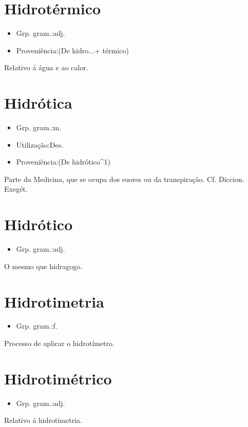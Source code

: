 \documentclass{article}
\begin{document}
\section{Hidrotérmico}
\begin{itemize}
\item {Grp. gram.:adj.}
\end{itemize}
\begin{itemize}
\item {Proveniência:(De \textunderscore hidro...\textunderscore  + \textunderscore térmico\textunderscore )}
\end{itemize}
Relativo á água e ao calor.
\section{Hidrótica}
\begin{itemize}
\item {Grp. gram.:m.}
\end{itemize}
\begin{itemize}
\item {Utilização:Des.}
\end{itemize}
\begin{itemize}
\item {Proveniência:(De \textunderscore hidrótico\textunderscore ^1)}
\end{itemize}
Parte da Medicina, que se ocupa dos suores ou da transpiração. Cf. \textunderscore Diccion. Exegét.\textunderscore 
\section{Hidrótico}
\begin{itemize}
\item {Grp. gram.:adj.}
\end{itemize}
O mesmo que \textunderscore hidragogo\textunderscore .
\section{Hidrotimetria}
\begin{itemize}
\item {Grp. gram.:f.}
\end{itemize}
Processo de aplicar o hidrotímetro.
\section{Hidrotimétrico}
\begin{itemize}
\item {Grp. gram.:adj.}
\end{itemize}
Relativo á hidrotimetria.
\end{document}
